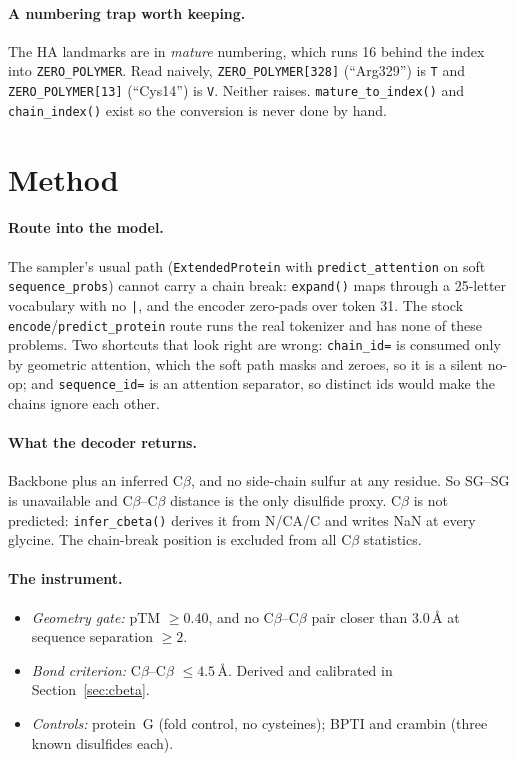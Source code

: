 \documentclass[11pt,a4paper]{article}
\newcommand{\ang}{\,\mbox{\AA}}
\begin{document}
\paragraph{A numbering trap worth keeping.} The HA landmarks are in
\emph{mature} numbering, which runs 16 behind the index into
\texttt{ZERO\_POLYMER}. Read naively, \texttt{ZERO\_POLYMER[328]} (``Arg329'')
is \texttt{T} and \texttt{ZERO\_POLYMER[13]} (``Cys14'') is \texttt{V}.
Neither raises. \texttt{mature\_to\_index()} and \texttt{chain\_index()} exist
so the conversion is never done by hand.

\section{Method}

\paragraph{Route into the model.} The sampler's usual path
(\texttt{ExtendedProtein} with \texttt{predict\_attention} on soft
\texttt{sequence\_probs}) cannot carry a chain break: \texttt{expand()} maps
through a 25-letter vocabulary with no \texttt{|}, and the encoder zero-pads
over token 31. The stock \texttt{encode}/\texttt{predict\_protein} route runs
the real tokenizer and has none of these problems. Two shortcuts that look
right are wrong: \texttt{chain\_id=} is consumed only by geometric attention,
which the soft path masks and zeroes, so it is a silent no-op; and
\texttt{sequence\_id=} is an attention separator, so distinct ids would make
the chains ignore each other.

\paragraph{What the decoder returns.} Backbone plus an inferred C$\beta$, and
no side-chain sulfur at any residue. So SG--SG is unavailable and
C$\beta$--C$\beta$ distance is the only disulfide proxy. C$\beta$ is not
predicted: \texttt{infer\_cbeta()} derives it from N/CA/C and writes NaN at
every glycine. The chain-break position is excluded from all C$\beta$
statistics.

\paragraph{The instrument.}
\begin{itemize}
\item \emph{Geometry gate:} pTM $\ge 0.40$, and no C$\beta$--C$\beta$ pair
  closer than $3.0\ang$ at sequence separation $\ge 2$.
\item \emph{Bond criterion:} C$\beta$--C$\beta$ $\le 4.5\ang$. Derived and
  calibrated in Section~\ref{sec:cbeta}.
\item \emph{Controls:} protein~G (fold control, no cysteines); BPTI and
  crambin (three known disulfides each).
\end{itemize}
\end{document}
